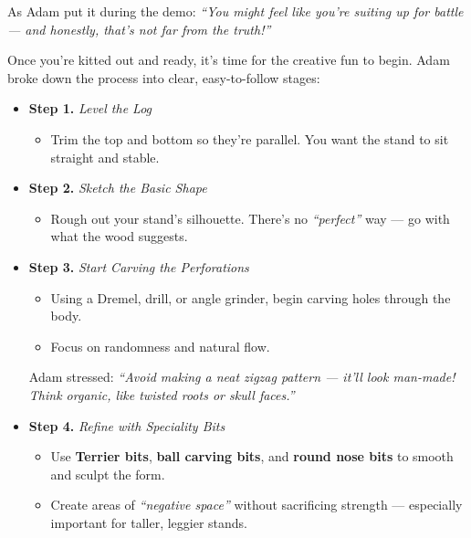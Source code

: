 As Adam put it during the demo: \textit{``You might feel like you're suiting up for battle --- and honestly, that's not far from the truth!''}

\medskip
{}
\noindent
Once you're kitted out and ready, it's time for the creative fun to begin. Adam broke down the process into clear, easy\--to\--follow stages:

\begin{itemize}
    \item \textbf{Step 1.} \textit{Level the Log}
    \begin{itemize}
        \item Trim the top and bottom so they're parallel. You want the stand to sit straight and stable.
    \end{itemize}

    \item \textbf{Step 2.} \textit{Sketch the Basic Shape}
    \begin{itemize}
        \item Rough out your stand's silhouette. There's no \textit{``perfect''} way --- go with what the wood suggests.
    \end{itemize}

    \columnbreak

    \item \textbf{Step 3.} \textit{Start Carving the Perforations}
    \begin{itemize}
        \item Using a Dremel, drill, or angle grinder, begin carving holes through the body.
                
        \item Focus on randomness and natural flow.
    \end{itemize}

    Adam stressed: \textit{``Avoid making a neat zigzag pattern --- it'll look man\--made! Think organic, like twisted roots or skull faces.''} 

    \item \textbf{Step 4.} \textit{Refine with Speciality Bits}
    \begin{itemize}
        \item Use \textbf{Terrier bits}, \textbf{ball carving bits}, and \textbf{round nose bits} to smooth and sculpt the form.
        
        \item Create areas of \textit{``negative space''} without sacrificing strength --- especially important for taller, leggier stands.
    \end{itemize}


\end{itemize}
